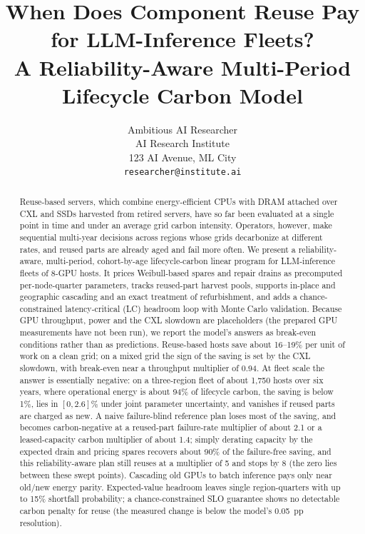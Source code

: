 \documentclass{article} %
\title{When Does Component Reuse Pay for LLM-Inference Fleets? \\ A Reliability-Aware Multi-Period Lifecycle Carbon Model}
\author{Ambitious AI Researcher\\
AI Research Institute\\
123 AI Avenue, ML City\\
\texttt{researcher@institute.ai}
}
\begin{document}
\maketitle

\begin{abstract}
Reuse-based servers, which combine energy-efficient CPUs with DRAM attached over CXL and SSDs harvested from retired servers, have so far been evaluated at a single point in time and under an average grid carbon intensity. Operators, however, make sequential multi-year decisions across regions whose grids decarbonize at different rates, and reused parts are already aged and fail more often. We present a reliability-aware, multi-period, cohort-by-age lifecycle-carbon linear program for LLM-inference fleets of 8-GPU hosts. It prices Weibull-based spares and repair drains as precomputed per-node-quarter parameters, tracks reused-part harvest pools, supports in-place and geographic cascading and an exact treatment of refurbishment, and adds a chance-constrained latency-critical (LC) headroom loop with Monte Carlo validation. Because GPU throughput, power and the CXL slowdown are placeholders (the prepared GPU measurements have not been run), we report the model's answers as break-even conditions rather than as predictions. Reuse-based hosts save about 16--19\% per unit of work on a clean grid; on a mixed grid the sign of the saving is set by the CXL slowdown, with break-even near a throughput multiplier of 0.94. At fleet scale the answer is essentially negative: on a three-region fleet of about 1,750 hosts over six years, where operational energy is about 94\% of lifecycle carbon, the saving is below 1\%, lies in $[0, 2.6]\%$ under joint parameter uncertainty, and vanishes if reused parts are charged as new. A naive failure-blind reference plan loses most of the saving, and becomes carbon-negative at a reused-part failure-rate multiplier of about 2.1 or a leased-capacity carbon multiplier of about 1.4; simply derating capacity by the expected drain and pricing spares recovers about 90\% of the failure-free saving, and this reliability-aware plan still reuses at a multiplier of 5 and stops by 8 (the zero lies between these swept points). Cascading old GPUs to batch inference pays only near old/new energy parity. Expected-value headroom leaves single region-quarters with up to 15\% shortfall probability; a chance-constrained SLO guarantee shows no detectable carbon penalty for reuse (the measured change is below the model's 0.05~pp resolution).
\end{abstract}
\end{document}
